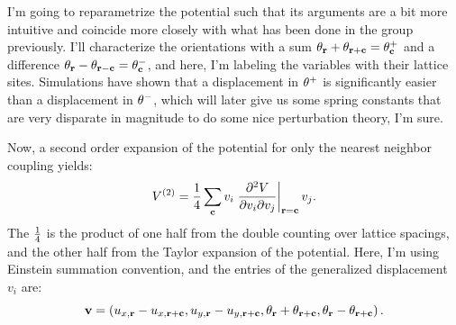 \documentclass[12pt]{article}
\begin{document}
I'm going to reparametrize the potential such that its arguments are a bit more intuitive and coincide more closely with what has been done in the group previously. I'll characterize the orientations with a sum $\theta_{\mathbf{r}} + \theta_{\mathbf{r} + \mathbf{c}} = \theta^+_{\mathbf{c}}$ and a difference $\theta_{\mathbf{r}} - \theta_{\mathbf{r} - \mathbf{c}} = \theta^-_{\mathbf{c}}$, and here, I'm labeling the variables with their lattice sites. Simulations have shown that a displacement in $\theta^+$ is significantly easier than a displacement in $\theta^-$, which will later give us some spring constants that are very disparate in magnitude to do some nice perturbation theory, I'm sure.

Now, a second order expansion of the potential for only the nearest neighbor coupling yields:
\[ V^{(2)} = \frac{1}{4}\sum_{\mathbf{c}} v_i \left.\frac{\partial^2 V}{\partial v_i \partial v_j}\right|_{\mathbf{r} = \mathbf{c}} v_j.\]
The $\frac{1}{4}$ is the product of one half from the double counting over lattice spacings, and the other half from the Taylor expansion of the potential. Here, I'm using Einstein summation convention, and the entries of the generalized displacement $v_i$ are:
\[ \mathbf{v} = \left(u_{x,\mathbf{r}}-u_{x,\mathbf{r} + \mathbf{c}},u_{y,\mathbf{r}} - u_{y,\mathbf{r} + \mathbf{c}},\theta_{\mathbf{r}} + \theta_{\mathbf{r} + \mathbf{c}},\theta_{\mathbf{r}} - \theta_{\mathbf{r} + \mathbf{c}}\right).\]
\end{document}

